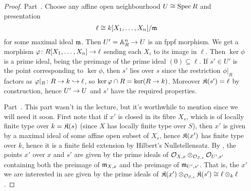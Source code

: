 \documentclass[a4paper,parskip=half,numbers=enddot, DIV=12]{scrreprt}
\begin{document}
\begin{proof}
	Part~. Choose any affine open neighbourhood $U\cong \operatorname{Spec} R$ and presentation
	\begin{align*}
		\ell\cong k[X_1,\ldots,X_n]/\mathfrak{m}
	\end{align*}
	for some maximal ideal $\mathfrak{m}$. Then $U'=\IA_R^n\morphism U$ is an fppf morphism. We get a morphism $\phi\colon R[X_1,\ldots,X_n]\morphism\ell$ sending each $X_i$ to its image in $\ell$. Then $\ker \phi$ is a prime ideal, being the preimage of the prime ideal $(0)\subseteq\ell$. If $s'\in U'$ is the point corresponding to $\ker \phi$, then $s'$ lies over $s$ since the restriction $\phi|_R$ factors as $\phi|_R\colon R\morphism k\monomorphism \ell$, so $\ker\phi\cap R=\ker(R\morphism k)$. Moreover $\mathfrak{K}(s')=\ell$ by construction, hence $U'\morphism U$ and $s'$ have the required properties.
	
	Part~. This part wasn't in the lecture, but it's worthwhile to mention since we will need it soon. First note that if $x'$ is closed in its fibre $X_s$, which is of locally finite type over $k=\mathfrak{K}(s)$ (since $X$ has locally finite type over $S$), then $x'$ is given by a maximal ideal of some affine open subset of $X_s$, hence $\mathfrak{K}(x')$ has finite type over $k$, hence it is a finite field extension by Hilbert's Nullstellensatz. By \cite[Proposition~1.3.2]{alggeo1}, the points $x'$ over $x$ and $s'$ are given by the prime ideals of $\mathcal{O}_{X,x}\otimes_{\mathcal{O}_{S,s}}\mathcal{O}_{U',s'}$ containing both the preimage of $\mathfrak{m}_{X,x}$ and the preimage of $\mathfrak{m}_{U',s'}$. That is, the $x'$ we are interested in are given by the prime ideals of $\mathfrak{K}(x')\otimes_{\mathcal{O}_{S,s}}\mathfrak{K}(s')\cong \ell\otimes_k\ell$.
	

\end{proof}
\end{document}
